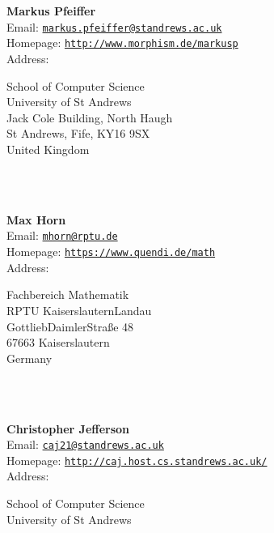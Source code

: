 \documentclass[a4paper,11pt]{report}
\begin{document}
\begin{titlepage}
\mbox{}\\
{\mbox{}\\
\small \noindent \textbf{ Markus Pfeiffer\\
    }  Email: \href{mailto://markus.pfeiffer@st-andrews.ac.uk} {\texttt{markus.pfeiffer@st\texttt{}andrews.ac.uk}}\\
  Homepage: \href{http://www.morphism.de/~markusp} {\texttt{http://www.morphism.de/\texttt{}markusp}}\\
  Address: \begin{minipage}[t]{8cm}\noindent
 School of Computer Science\\
 University of St Andrews\\
 Jack Cole Building, North Haugh\\
 St Andrews, Fife, KY16 9SX\\
 United Kingdom\\
 \end{minipage}
}\\
{\mbox{}\\
\small \noindent \textbf{ Max Horn\\
    }  Email: \href{mailto://mhorn@rptu.de} {\texttt{mhorn@rptu.de}}\\
  Homepage: \href{https://www.quendi.de/math} {\texttt{https://www.quendi.de/math}}\\
  Address: \begin{minipage}[t]{8cm}\noindent
 Fachbereich Mathematik\\
 RPTU Kaiserslautern\texttt{}Landau\\
 Gottlieb\texttt{}Daimler\texttt{}Stra{\ss}e 48\\
 67663 Kaiserslautern\\
 Germany\\
 \end{minipage}
}\\
{\mbox{}\\
\small \noindent \textbf{ Christopher Jefferson\\
    }  Email: \href{mailto://caj21@st-andrews.ac.uk} {\texttt{caj21@st\texttt{}andrews.ac.uk}}\\
  Homepage: \href{http://caj.host.cs.st-andrews.ac.uk/} {\texttt{http://caj.host.cs.st\texttt{}andrews.ac.uk/}}\\
  Address: \begin{minipage}[t]{8cm}\noindent
 School of Computer Science\\
 University of St Andrews\\

\end{minipage}}
\end{titlepage}
\end{document}
